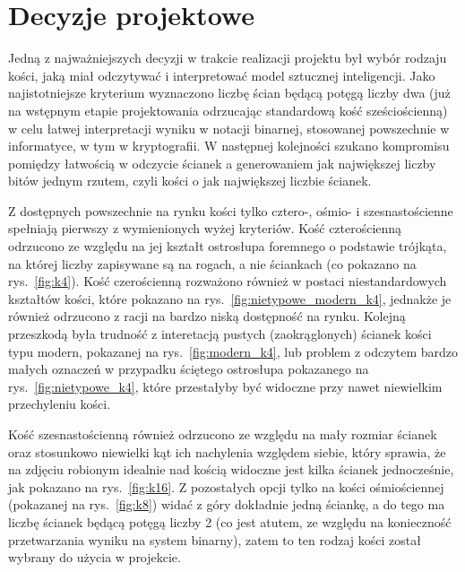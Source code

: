 \section{Decyzje projektowe}\label{sec:decyzje-projektowe}

Jedną z najważniejszych decyzji w trakcie realizacji projektu był wybór rodzaju kości, jaką miał odczytywać
i interpretować model sztucznej inteligencji.
Jako najistotniejsze kryterium wyznaczono liczbę ścian będącą potęgą liczby dwa
(już na wstępnym etapie projektowania odrzucając standardową kość sześciościenną)
w celu łatwej interpretacji wyniku w notacji binarnej, stosowanej powszechnie w informatyce, w tym w kryptografii.
W następnej kolejności szukano kompromisu pomiędzy łatwością w odczycie ścianek a generowaniem jak największej liczby
bitów jednym rzutem, czyli kości o jak największej liczbie ścianek.

Z dostępnych powszechnie na rynku kości tylko cztero-, ośmio- i szesnastościenne spełniają pierwszy z wymienionych wyżej kryteriów.
Kość czterościenną odrzucono ze względu na jej kształt ostrosłupa foremnego o podstawie trójkąta,
na której liczby zapisywane są na rogach, a nie ściankach (co pokazano na rys.~\ref{fig:k4}).
Kość czerościenną rozważono również w postaci niestandardowych kształtów kości, które pokazano na rys.~\ref{fig:nietypowe_modern_k4},
jednakże je również odrzucono z racji na bardzo niską dostępność na rynku. Kolejną przeszkodą była trudność
z interetacją pustych (zaokrąglonych) ścianek kości typu modern, pokazanej na rys.~\ref{fig:modern_k4},
lub problem z odczytem bardzo małych oznaczeń w przypadku ściętego ostrosłupa pokazanego na rys.~\ref{fig:nietypowe_k4}, 
które przestałyby być widoczne przy nawet niewielkim przechyleniu kości.

Kość szesnastościenną również odrzucono ze względu na mały rozmiar ścianek oraz stosunkowo niewielki kąt ich nachylenia względem siebie,
który sprawia, że na zdjęciu robionym idealnie nad kością widoczne jest kilka ścianek jednocześnie, jak pokazano na rys.~\ref{fig:k16}.
Z pozostałych opcji tylko na kości ośmiościennej (pokazanej na rys.~\ref{fig:k8}) widać z góry dokładnie jedną ściankę,
a do tego ma liczbę ścianek będącą potęgą liczby 2 (co jest atutem, ze względu na konieczność przetwarzania wyniku na system binarny), zatem to ten rodzaj kości został wybrany do użycia w projekcie.

